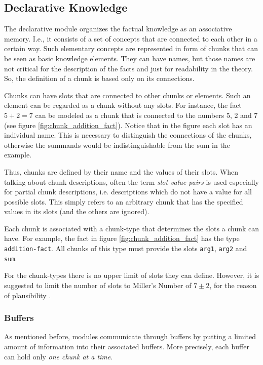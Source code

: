 \subsection{Declarative Knowledge}

The declarative module organizes the factual knowledge as an associative memory. I.e., it consists of a set of concepts that are connected to each other in a certain way. Such elementary concepts are represented in form of chunks that can be seen as basic knowledge elements. They can have names, but those names are not critical for the description of the facts and just for readability in the theory. So, the definition of a chunk is based only on its connections. 

Chunks can have slots that are connected to other chunks or elements. Such an element can be regarded as a chunk without any slots. For instance, the fact $5 + 2 = 7$ can be modeled as a chunk that is connected to the numbers 5, 2 and 7 (see figure \ref{fig:chunk_addition_fact}). Notice that in the figure each slot has an individual name. This is necessary to distinguish the connections of the chunks, otherwise the summands would be indistinguishable from the sum in the example.

Thus, chunks are defined by their name and the values of their slots. When talking about chunk descriptions, often the term \emph{slot-value pairs} is used especially for partial chunk descriptions, i.e. descriptions which do not have a value for all possible slots. This simply refers to an arbitrary chunk that has the specified values in its slots (and the others are ignored).

Each chunk is associated with a chunk-type that determines the slots a chunk can have. For example, the fact in figure \ref{fig:chunk_addition_fact} has the type \verb|addition-fact|. All chunks of this type must provide the slots \verb|arg1|, \verb|arg2| and \verb|sum|.

\label{millers_number}
For the chunk-types there is no upper limit of slots they can define. However, it is suggested to limit the number of slots to Miller's Number of $7 \pm 2$, for the reason of plausibility \cite[230]{stewart_deconstructing_2007}. 

\subsubsection{Buffers}

As mentioned before, modules communicate through buffers by putting a limited amount of information into their associated buffers. More precisely, each buffer can hold only \emph{one chunk at a time}.

